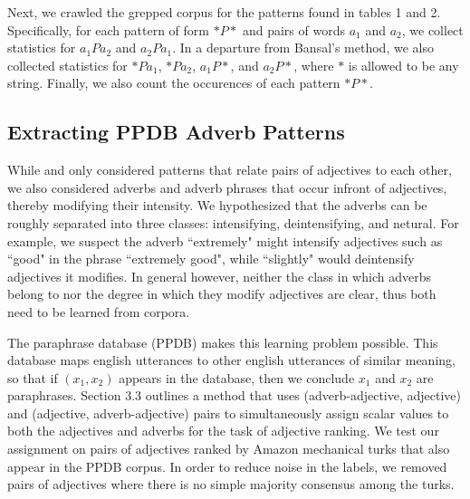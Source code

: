 \documentclass[11pt,letterpaper]{article}
\begin{document}
Next, we crawled the grepped corpus for the patterns found in tables 1 and 2. Specifically, for each pattern of form $* P *$ and pairs of words $a_1$ and $a_2$, we collect statistics for $a_1 P a_2$ and $a_2 P a_1$. In a departure from Bansal's method, we also collected statistics for $* P a_1$, $* P a_2$, $a_1 P *$, and $a_2 P *$, where $*$ is allowed to be any string. Finally, we also count the occurences of each pattern $* P *$.

\subsection{Extracting PPDB Adverb Patterns}

While  and  only considered patterns that relate pairs of adjectives to each other, we also considered adverbs and adverb phrases that occur infront of adjectives, thereby modifying their intensity. We hypothesized that the adverbs can be roughly separated into three classes: intensifying, deintensifying, and netural. For example, we suspect the adverb ``extremely" might intensify adjectives such as ``good" in the phrase ``extremely good", while ``slightly" would deintensify adjectives it modifies. In general however, neither the class in which adverbs belong to nor the degree in which they modify adjectives are clear, thus both need to be learned from corpora. 

The paraphrase database (PPDB) \cite{pavlick-EtAl:2015:ACL-IJCNLP3} makes this learning problem possible. This database maps english utterances to other english utterances of similar meaning, so that if $(x_1, x_2)$ appears in the database, then we conclude $x_1$ and $x_2$ are paraphrases. Section 3.3 outlines a method that uses (adverb-adjective, adjective) and (adjective, adverb-adjective) pairs to simultaneously assign scalar values to both the adjectives and adverbs for the task of adjective ranking. We test our assignment on pairs of adjectives ranked by Amazon mechanical turks that also appear in the PPDB corpus. In order to reduce noise in the labels, we removed pairs of adjectives where there is no simple majority consensus among the turks. 

\end{document}
